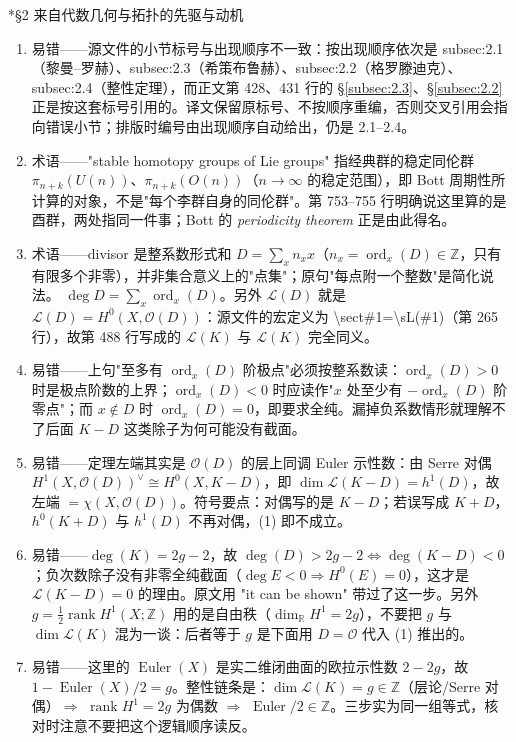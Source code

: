 \documentclass[11pt]{amsart}
\makeatletter
\def\subsection{\@startsection{subsection}{2}%
   \z@{1.25\linespacing\@plus.7\linespacing}{.5\linespacing}%
   {\normalfont\bfseries}}
\theoremstyle{definition}
\theoremstyle{remark}
\theoremstyle{plain}
\numberwithin{equation}{section}
\renewcommand{\:}{\colon}
\newcommand{\RR}{{\mathbb R}}
\newcommand{\ZZ}{{\mathbb Z}}
\DeclareMathOperator{\rank}{rank}
\DeclareMathOperator{\Euler}{Euler}
\DeclareMathOperator{\ord}{ord}
\newcommand{\sL}{\mathcal{L}}
\newcommand{\sO}{\mathcal{O}}
\newcommand{\sect}[1]{\sL(#1)}
\makeatother
\begin{document}
\subsection*{§2 来自代数几何与拓扑的先驱与动机}
\begin{enumerate}[leftmargin=2.2em,itemsep=2pt,topsep=2pt]
  \item 易错——源文件的小节标号与出现顺序不一致：按出现顺序依次是 subsec:2.1（黎曼–罗赫）、subsec:2.3（希策布鲁赫）、subsec:2.2（格罗滕迪克）、subsec:2.4（整性定理），而正文第 428、431 行的 \S\ref{subsec:2.3}、\S\ref{subsec:2.2} 正是按这套标号引用的。译文保留原标号、不按顺序重编，否则交叉引用会指向错误小节；排版时编号由出现顺序自动给出，仍是 2.1–2.4。
  \item 术语——"stable homotopy groups of Lie groups" 指经典群的稳定同伦群 $\pi_{n+k}(U(n))$、$\pi_{n+k}(O(n))$（$n\to\infty$ 的稳定范围），即 Bott 周期性所计算的对象，不是"每个李群自身的同伦群"。第 753–755 行明确说这里算的是酉群，两处指同一件事；Bott 的 {\it periodicity theorem} 正是由此得名。
  \item 术语——divisor 是整系数形式和 $D=\sum_x n_xx$（$n_x=\ord_x(D)\in\ZZ$，只有有限多个非零），并非集合意义上的"点集"；原句"每点附一个整数"是简化说法。 $\deg D=\sum_x\ord_x(D)$。另外 $\sect D$ 就是 $\sL(D)=H^0(X,\sO(D))$：源文件的宏定义为 \textbackslash{}sect{\#1}=\textbackslash{}sL(\#1)（第 265 行），故第 488 行写成的 $\sL(K)$ 与 $\sect K$ 完全同义。
  \item 易错——上句"至多有 $\ord_x(D)$ 阶极点"必须按整系数读：$\ord_x(D)>0$ 时是极点阶数的上界；$\ord_x(D)<0$ 时应读作"$x$ 处至少有 $-\ord_x(D)$ 阶零点"；而 $x\notin D$ 时 $\ord_x(D)=0$，即要求全纯。漏掉负系数情形就理解不了后面 $K-D$ 这类除子为何可能没有截面。
  \item 易错——定理左端其实是 $\sO(D)$ 的层上同调 Euler 示性数：由 Serre 对偶 $H^1(X,\sO(D))^\vee\cong H^0(X,K-D)$，即 $\dim\sect{K-D}=h^1(D)$，故左端 $=\chi(X,\sO(D))$。符号要点：对偶写的是 $K-D$；若误写成 $K+D$，$h^0(K+D)$ 与 $h^1(D)$ 不再对偶，(1) 即不成立。
  \item 易错——$\deg(K)=2g-2$，故 $\deg(D)>2g-2\iff\deg(K-D)<0$；负次数除子没有非零全纯截面（$\deg E<0\Rightarrow H^0(E)=0$），这才是 $\sect{K-D}=0$ 的理由。原文用 "it can be shown" 带过了这一步。另外 $g=\frac12\rank H^1(X;\ZZ)$ 用的是自由秩（$\dim_\RR H^1=2g$），不要把 $g$ 与 $\dim\sect K$ 混为一谈：后者等于 $g$ 是下面用 $D=\sO$ 代入 (1) 推出的。
  \item 易错——这里的 $\Euler(X)$ 是实二维闭曲面的欧拉示性数 $2-2g$，故 $1-\Euler(X)/2=g$。整性链条是：$\dim\sect K=g\in\ZZ$（层论/Serre 对偶）$\Rightarrow$ $\rank H^1=2g$ 为偶数 $\Rightarrow$ $\Euler/2\in\ZZ$。三步实为同一组等式，核对时注意不要把这个逻辑顺序读反。

\end{enumerate}
\end{document}
